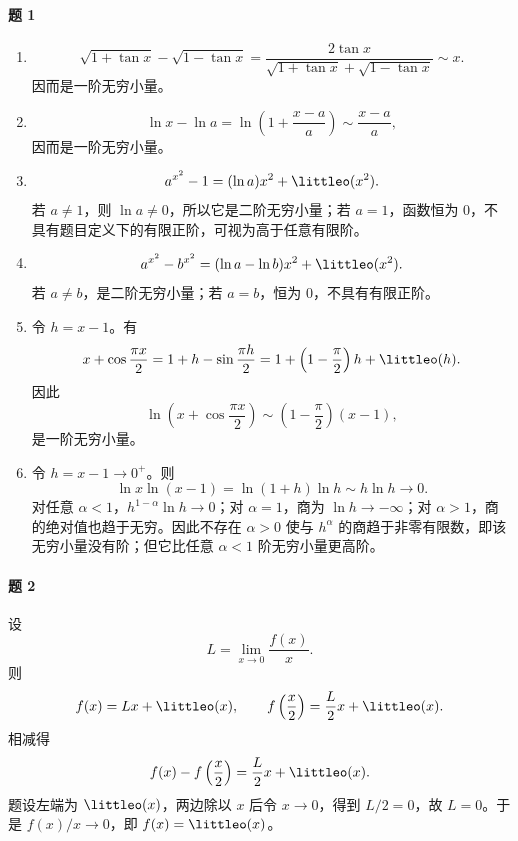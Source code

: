 \paragraph{题 1}
\begin{xsolution}
\begin{enumerate}[label=(\arabic*)]
  \item
  \[
    \sqrt{1+\tan x}-\sqrt{1-\tan x}
    =\frac{2\tan x}{\sqrt{1+\tan x}+\sqrt{1-\tan x}}
    \sim x.
  \]
  因而是一阶无穷小量。

  \item
  \[
    \ln x-\ln a=\ln\left(1+\frac{x-a}{a}\right)
    \sim\frac{x-a}{a},
  \]
  因而是一阶无穷小量。

  \item
  \[
    a^{x^2}-1=(\ln a)x^2+\littleo(x^2).
  \]
  若 $a\ne1$，则 $\ln a\ne0$，所以它是二阶无穷小量；若 $a=1$，函数恒为 0，不具有题目定义下的有限正阶，可视为高于任意有限阶。

  \item
  \[
    a^{x^2}-b^{x^2}
    =(\ln a-\ln b)x^2+\littleo(x^2).
  \]
  若 $a\ne b$，是二阶无穷小量；若 $a=b$，恒为 0，不具有有限正阶。

  \item 令 $h=x-1$。有
  \[
    x+\cos\frac{\pi x}{2}
    =1+h-\sin\frac{\pi h}{2}
    =1+\left(1-\frac\pi2\right)h+\littleo(h).
  \]
  因此
  \[
    \ln\left(x+\cos\frac{\pi x}{2}\right)
    \sim\left(1-\frac\pi2\right)(x-1),
  \]
  是一阶无穷小量。

  \item 令 $h=x-1\to0^+$。则
  \[
    \ln x\ln(x-1)=\ln(1+h)\ln h\sim h\ln h\to0.
  \]
  对任意 $\alpha<1$，$h^{1-\alpha}\ln h\to0$；对 $\alpha=1$，商为 $\ln h\to-\infty$；对 $\alpha>1$，商的绝对值也趋于无穷。因此不存在 $\alpha>0$ 使与 $h^\alpha$ 的商趋于非零有限数，即该无穷小量没有阶；但它比任意 $\alpha<1$ 阶无穷小量更高阶。
\end{enumerate}
\end{xsolution}

\paragraph{题 2}
\begin{xsolution}
设
\[
  L=\lim_{x\to0}\frac{f(x)}x.
\]
则
\[
  f(x)=Lx+\littleo(x),
  \qquad
  f\left(\frac x2\right)=\frac L2x+\littleo(x).
\]
相减得
\[
  f(x)-f\left(\frac x2\right)=\frac L2x+\littleo(x).
\]
题设左端为 $\littleo(x)$，两边除以 $x$ 后令 $x\to0$，得到 $L/2=0$，故 $L=0$。于是
$f(x)/x\to0$，即 $f(x)=\littleo(x)$。
\end{xsolution}

